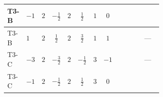 \documentclass[8pt]{article}
\begin{document}
\begin{landscape}
\begin{longtable}{@{}llcccccc >{\raggedright\arraybackslash}p{0.21\linewidth} >{\raggedright\arraybackslash}p{0.21\linewidth} >{\raggedright\arraybackslash}p{0.21\linewidth}@{}}
T3-B & $-1$ & $2$ & $-\frac{1}{2}$ & $2$ & $\frac{1}{2}$ & $1$ & $0$ & \scriptsize\adjustbox{max width=\linewidth}{$\begin{gathered} +\frac{3 {g_1}^4}{4}\end{gathered}$} & \scriptsize\adjustbox{max width=\linewidth}{$\begin{gathered} +\frac{3 {\lambda_{12}^{(A)}}^2}{4}\end{gathered}$} & \scriptsize\adjustbox{max width=\linewidth}{$\begin{gathered} +{\lambda_{10}} \left(\frac{3}{2} \operatorname{Tr}\!\left({y_1}\,\left({y_2}\right)^{\dagger}\right)+9 (\left({\lambda_{10}}\right)^{*}+\left({\lambda_{11}}\right)^{*})\right) \\ +{\lambda_{11}} \left(\frac{3}{2} \operatorname{Tr}\!\left({y_1}\,\left({y_2}\right)^{\dagger}\right)+9 (\left({\lambda_{10}}\right)^{*}+\left({\lambda_{11}}\right)^{*})\right)\end{gathered}$} \\
\midrule
T3-B & $1$ & $2$ & $\frac{1}{2}$ & $2$ & $\frac{3}{2}$ & $1$ & $1$ & \scriptsize\adjustbox{max width=\linewidth}{$\begin{gathered} +\frac{27 {g_1}^4}{4}\end{gathered}$} & \scriptsize\adjustbox{max width=\linewidth}{$\begin{gathered} +\frac{3 {\lambda_{12}^{(A)}}^2}{4}\end{gathered}$} & --- \\
\midrule
T3-C & $-3$ & $2$ & $-\frac{3}{2}$ & $2$ & $-\frac{1}{2}$ & $3$ & $-1$ & \scriptsize\adjustbox{max width=\linewidth}{$\begin{gathered} +\frac{27 {g_1}^4}{4}\end{gathered}$} & \scriptsize\adjustbox{max width=\linewidth}{$\begin{gathered} +\frac{3 {\lambda_{12}^{(A)}}^2}{4}\end{gathered}$} & --- \\
\midrule
T3-C & $-1$ & $2$ & $-\frac{1}{2}$ & $2$ & $\frac{1}{2}$ & $3$ & $0$ & \scriptsize\adjustbox{max width=\linewidth}{$\begin{gathered} +\frac{3 {g_1}^4}{4}\end{gathered}$} & \scriptsize\adjustbox{max width=\linewidth}{$\begin{gathered} +\frac{3 {\lambda_{12}^{(A)}}^2}{4}\end{gathered}$} & \scriptsize\adjustbox{max width=\linewidth}{$\begin{gathered} +{\lambda_{10}} \left(\frac{9}{4} \operatorname{Tr}\!\left({y_1}\,\left({y_2}\right)^{\dagger}\right)+9 (\left({\lambda_{10}}\right)^{*}+\left({\lambda_{11}}\right)^{*})\right) \\ +{\lambda_{11}} \left(\frac{9}{4} \operatorname{Tr}\!\left({y_1}\,\left({y_2}\right)^{\dagger}\right)+9 (\left({\lambda_{10}}\right)^{*}+\left({\lambda_{11}}\right)^{*})\right)\end{gathered}$} \\

\end{longtable}
\end{landscape}
\end{document}
